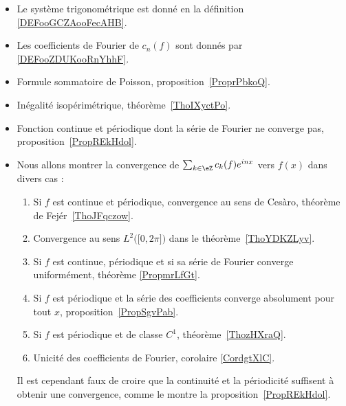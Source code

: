        \label{THMooHWEBooTMInve}
\begin{itemize}
	\item Le système trigonométrique est donné en la définition \ref{DEFooGCZAooFecAHB}.
	\item Les coefficients de Fourier de \( c_n(f)\) sont donnés par \ref{DEFooZDUKooRnYhhF}.
	\item Formule sommatoire de Poisson, proposition~\ref{ProprPbkoQ}.
	\item Inégalité isopérimétrique, théorème~\ref{ThoIXyctPo}.
	\item Fonction continue et périodique dont la série de Fourier ne converge pas, proposition~\ref{PropREkHdol}.

	\item
	      Nous allons montrer la convergence de \( \sum_{k\in \eZ}c_k(f) e^{inx}\) vers \( f(x)\) dans divers cas :
	      \begin{enumerate}
		      \item
		            Si \( f\) est continue et périodique, convergence au sens de Cesàro, théorème de Fejér~\ref{ThoJFqczow}.
		      \item
		            Convergence au sens \( L^2\Big( \mathopen[ 0 , 2\pi \mathclose] \Big)\) dans le théorème~\ref{ThoYDKZLyv}.
		      \item
		            Si \( f\) est continue, périodique et si sa série de Fourier converge uniformément, théorème \ref{PropmrLfGt}.
		      \item
		            Si \( f\) est périodique et la série des coefficients converge absolument pour tout \( x\), proposition~\ref{PropSgvPab}.
		      \item
		            Si \( f\) est périodique et de classe \( C^1\), théorème~\ref{ThozHXraQ}.
		      \item
		            Unicité des coefficients de Fourier, corolaire \ref{CordgtXlC}.
	      \end{enumerate}
	      Il est cependant faux de croire que la continuité et la périodicité suffisent à obtenir une convergence, comme le montre la proposition~\ref{PropREkHdol}.
\end{itemize}
